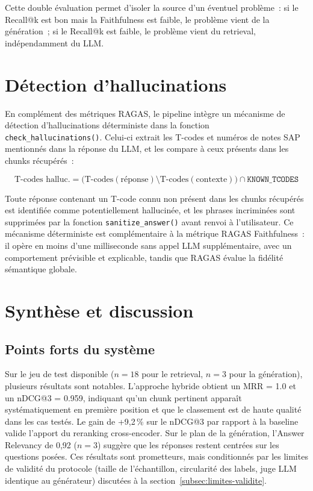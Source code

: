 Cette double évaluation permet d'isoler la source d'un éventuel problème~: si le Recall@k est bon mais la Faithfulness est faible, le problème vient de la génération~; si le Recall@k est faible, le problème vient du retrieval, indépendamment du LLM.

\section{Détection d'hallucinations}

En complément des métriques RAGAS, le pipeline intègre un mécanisme de détection d'hallucinations déterministe dans la fonction \texttt{check\_hallucinations()}. Celui-ci extrait les T-codes et numéros de notes SAP mentionnés dans la réponse du LLM, et les compare à ceux présents dans les chunks récupérés~:

\[
\text{T-codes halluc.} = \bigl(\text{T-codes}(\text{réponse}) \setminus \text{T-codes}(\text{contexte})\bigr) \cap \texttt{KNOWN\_TCODES}
\]

Toute réponse contenant un T-code connu non présent dans les chunks récupérés est identifiée comme potentiellement hallucinée, et les phrases incriminées sont supprimées par la fonction \texttt{sanitize\_answer()} avant renvoi à l'utilisateur. Ce mécanisme déterministe est complémentaire à la métrique RAGAS Faithfulness~: il opère en moins d'une milliseconde sans appel LLM supplémentaire, avec un comportement prévisible et explicable, tandis que RAGAS évalue la fidélité sémantique globale.

\section{Synthèse et discussion}

\subsection{Points forts du système}

Sur le jeu de test disponible ($n = 18$ pour le retrieval, $n = 3$ pour la génération), plusieurs résultats sont notables. L'approche hybride obtient un MRR = 1.0 et un nDCG@3 = 0.959, indiquant qu'un chunk pertinent apparaît systématiquement en première position et que le classement est de haute qualité dans les cas testés. Le gain de +9,2\,\% sur le nDCG@3 par rapport à la baseline valide l'apport du reranking cross-encoder. Sur le plan de la génération, l'Answer Relevancy de 0,92 ($n = 3$) suggère que les réponses restent centrées sur les questions posées. Ces résultats sont prometteurs, mais conditionnés par les limites de validité du protocole (taille de l'échantillon, circularité des labels, juge LLM identique au générateur) discutées à la section~\ref{subsec:limites-validite}.

